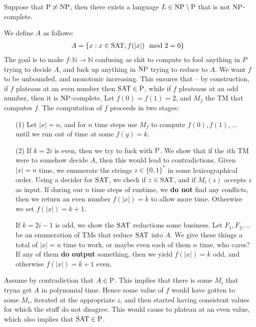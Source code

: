 \begin{note}
  Suppose that $\mathrm{P} \neq \mathrm{NP}$, then there exists a language
  $L \in \mathrm{NP} \setminus \mathrm{P}$ that is not $\mathrm{NP}$-complete.
\end{note}

\begin{note}
  We define $A$ as follows:
  \begin{align*}
    A = \{ x : x \in \mathrm{SAT}, f(|x|) \mod 2 = 0\}
  \end{align*}
  The goal is to make $f : \mathbb{N} \to \mathbb{N}$
  confusing as shit to compute to fool anything in $P$
  trying to decide $A$, and fuck up anything in $\mathrm{NP}$ trying to reduce to $A$.
  We want $f$ to be unbounded, and monotonic increasing.
  This ensures that -- by construction, if $f$ plateaus at an even number then
  $\mathrm{SAT} \in \mathrm{P}$, while if $f$ pleateaus at an odd number, then it is
  $\mathrm{NP}$-complete.
  Let $f(0) = f(1) = 2$, and $M_f$ the TM that computes $f$.
  The computation of $f$ proceeds in two stages:
  \begin{enumerate}
    \item [(1)]
        Let $|x| = n$, and for $n$ time steps use $M_f$ to compute
        $f(0), f(1), \dots$ until we run out of time at some
        $f(y) = k$.

    \item [(2)]
      If $k = 2i$ is even, then we try to fuck with $\mathrm{P}$.
      We show that if the $i$th TM were to somehow decide $A$, then this would
      lead to contradictions.
      Given $|x| = n$ time, we enumerate the strings $z \in \{0, 1\}^\ast$ in
      some lexicographical order.
      Using a decider for $\mathrm{SAT}$, we check if $z \in \mathrm{SAT}$, and if $M_i (z)$
      accepts $z$ as input.
      If during our $n$ time steps of runtime, we \textbf{do not} find any
      conflicts, then we return an even number $f(|x|) = k$ to allow more time.
      Otherwise we set $f(|x|) = k + 1$.

      If $k = 2i - 1$ is odd, we show the $\mathrm{SAT}$ reductions some business.
      Let $F_1, F_2, \dots$ be an enumeration of TMs that reduce $\mathrm{SAT}$ into
      $A$.
      We give these things a total of $|x| = n$ time to work, or maybe even
      each of them $n$ time, who cares?
      If any of them \textbf{do output} something,
      then we yield $f(|x|) = k$ odd, and otherwise $f(|x|) = k + 1$ even.
  \end{enumerate}

  Assume by contradiction that $A \in \mathrm{P}$.
  This implies that there is some $M_i$ that tryna get $A$ in polynomial time.
  Hence some value of $f$ would have gotten to some $M_i$, iterated at
  the appropriate $z$, and then started having consistent values for which the
  stuff do not disagree.
  This would cause to plateau at an even value, which also implies that
  $\mathrm{SAT} \in \mathrm{P}$.


\end{note}
